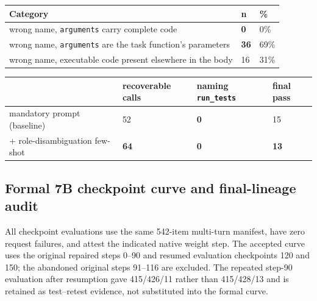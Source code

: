 \begin{center}
\begin{minipage}{\linewidth}
\centering
\small
{}\label{tab:probe_categories}
\begin{tabular}{@{}lll@{}}
\toprule
Category & n & \% \\
\midrule
wrong name, \texttt{arguments} carry complete code & \textbf{0} & 0\% \\
wrong name, \texttt{arguments} are the task function's parameters & \textbf{36} & 69\% \\
wrong name, executable code present elsewhere in the body & 16 & 31\% \\
\bottomrule
\end{tabular}
\end{minipage}
\end{center}

\begin{center}
\begin{minipage}{\linewidth}
\centering
\small
{}\label{tab:pressure}
\begin{tabular}{@{}llll@{}}
\toprule
& recoverable calls & \textbf{naming \texttt{run\_tests}} & final pass \\
\midrule
mandatory prompt (baseline) & 52 & \textbf{0} & 15 \\
+ role-disambiguation few-shot & \textbf{64} & \textbf{0} & \textbf{13} \\
\bottomrule
\end{tabular}
\end{minipage}
\end{center}

\subsection{Formal 7B checkpoint curve and final-lineage audit}
\label{app:p3curve}

All checkpoint evaluations use the same 542-item multi-turn manifest, have zero request failures,
and attest the indicated native weight step. The accepted curve uses the original repaired steps
0--90 and resumed evaluation checkpoints 120 and 150; the abandoned original steps 91--116 are excluded. The repeated
step-90 evaluation after resumption gave 415/426/11 rather than 415/428/13 and is retained as
test--retest evidence, not substituted into the formal curve.

